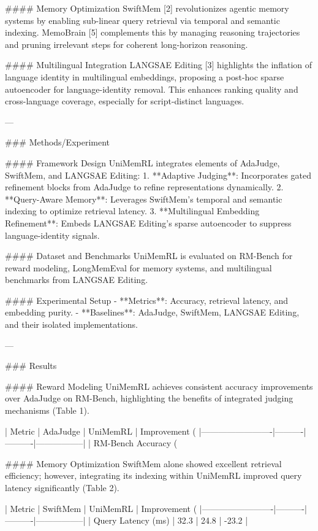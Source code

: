 #### Memory Optimization  
SwiftMem [2] revolutionizes agentic memory systems by enabling sub-linear query retrieval via temporal and semantic indexing. MemoBrain [5] complements this by managing reasoning trajectories and pruning irrelevant steps for coherent long-horizon reasoning.  

#### Multilingual Integration  
LANGSAE Editing [3] highlights the inflation of language identity in multilingual embeddings, proposing a post-hoc sparse autoencoder for language-identity removal. This enhances ranking quality and cross-language coverage, especially for script-distinct languages.  

---

### Methods/Experiment  

#### Framework Design  
UniMemRL integrates elements of AdaJudge, SwiftMem, and LANGSAE Editing:  
1. **Adaptive Judging**: Incorporates gated refinement blocks from AdaJudge to refine representations dynamically.  
2. **Query-Aware Memory**: Leverages SwiftMem’s temporal and semantic indexing to optimize retrieval latency.  
3. **Multilingual Embedding Refinement**: Embeds LANGSAE Editing’s sparse autoencoder to suppress language-identity signals.  

#### Dataset and Benchmarks  
UniMemRL is evaluated on RM-Bench for reward modeling, LongMemEval for memory systems, and multilingual benchmarks from LANGSAE Editing.  

#### Experimental Setup  
- **Metrics**: Accuracy, retrieval latency, and embedding purity.  
- **Baselines**: AdaJudge, SwiftMem, LANGSAE Editing, and their isolated implementations.  

---

### Results  

#### Reward Modeling  
UniMemRL achieves consistent accuracy improvements over AdaJudge on RM-Bench, highlighting the benefits of integrated judging mechanisms (Table 1).  

| Metric                  | AdaJudge | UniMemRL | Improvement (%
|-------------------------|----------|----------|-----------------|  
| RM-Bench Accuracy (%

#### Memory Optimization  
SwiftMem alone showed excellent retrieval efficiency; however, integrating its indexing within UniMemRL improved query latency significantly (Table 2).  

| Metric                  | SwiftMem | UniMemRL | Improvement (%
|-------------------------|----------|----------|-----------------|  
| Query Latency (ms)     | 32.3     | 24.8     | -23.2           |  

